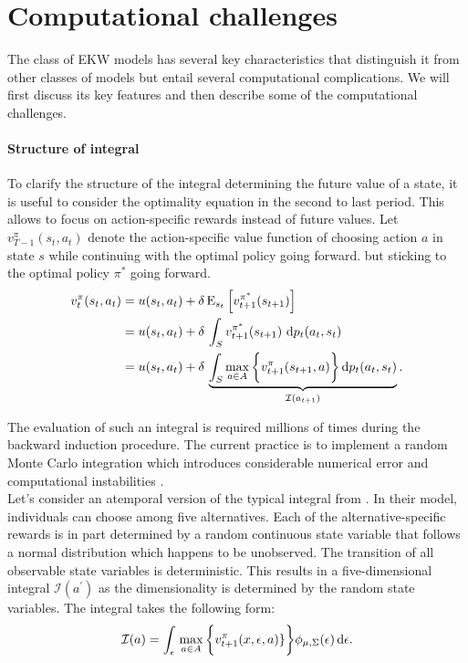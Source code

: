 \section{Computational challenges}\label{Computation}
The class of EKW models has several key characteristics that distinguish it from other classes of models but entail several computational complications. We will first discuss its key features and then describe some of the computational challenges.
\paragraph{Structure of integral} To clarify the structure of the integral determining the future value of a state, it is useful to consider the optimality equation in the second to last period. This allows to focus on action-specific rewards instead of future values. Let $v^{\pi}_{T-1}(s_t, a_t)$ denote the action-specific value function of choosing action $a$ in state $s$ while continuing with the optimal policy going forward.
but sticking to the optimal policy $\pi^*$ going forward.
%
\begin{align}
v^{\pi}_{t}(s_t, a_t) & = u(s_t, a_t) + \delta\,\mathrm{E}_{s_t} \left[v^{\pi^*}_{t + 1}(s_{t + 1})\right] \\
& =  u(s_t, a_t) + \delta\, \int_S v^{\pi^*}_{t + 1}(s_{t + 1})\, \mathop{}\!\mathrm{d} p_t(a_t, s_t)\\
& =  u(s_t, a_t) + \delta\, \underbrace{\int_S \max_{a \in A}\bigg\{v^\pi_{t + 1}(s_{t + 1}, a)\bigg\}\mathop{}\!\mathrm{d} p_t(a_t, s_t)}_{\mathcal{I}(a_{t + 1})}.
\end{align}

The evaluation of such an integral is required millions of times during the backward induction procedure. The current practice is to implement a random Monte Carlo integration which introduces considerable numerical error and computational instabilities \citep{Judd.2011}.\\

Let's consider an atemporal version of the typical integral from \citet{Keane.1997}. In their model, individuals can choose among five alternatives. Each of the alternative-specific rewards is in part determined by a random continuous state variable that follows a normal distribution which happens to be unobserved. The transition of all observable state variables is deterministic. This results in a five-dimensional integral $\mathcal{I}(a^\prime)$ as the dimensionality is determined by the random state variables. The integral takes the following form:
%
\begin{align*}
\mathcal{I}(a) = \int_{\epsilon}\, \max_{a\in A} \bigg\{v^\pi_{t + 1}(x, \epsilon, a)\}\bigg\} \phi_{\mu, \Sigma}(\epsilon) \mathop{}\!\mathrm{d}\epsilon.
\end{align*}

